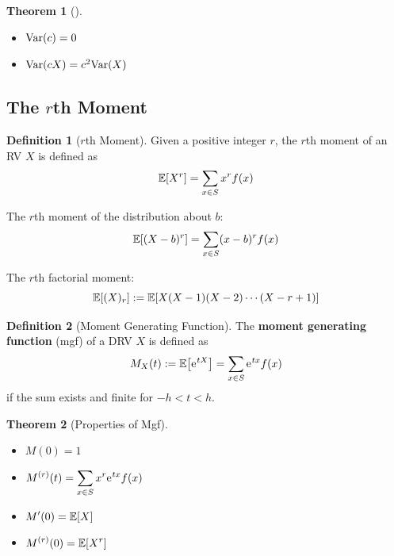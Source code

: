 \documentclass[10pt,UTF8]{article}
\newenvironment{definition box}
{\begin{tcolorbox}[colback=blue!5!white,colframe=blue!75!black,parbox=false,before upper=\par,before lower=\par]}
{\end{tcolorbox}}
\newenvironment{theorem box}
{\begin{tcolorbox}[colback=yellow!5!white,colframe=yellow!75!black,parbox=false,before upper=\par,before lower=\par]}
{\end{tcolorbox}}
\theoremstyle{definition}
\newtheorem{definition inner}{Definition}[section]
\newenvironment{definition}[1][]
{\begin{definition box}\begin{definition inner}[#1]\hfill\par}
{\end{definition inner}\end{definition box}}
\theoremstyle{plain}
\newtheorem{theorem inner}{Theorem}[section]
\newenvironment{theorem}[1][]
{\begin{theorem box}\begin{theorem inner}[#1]\hfill\par}
{\end{theorem inner}\end{theorem box}}
\theoremstyle{definition}
\newtheorem*{proof inner}{\textit{Proof}}
\theoremstyle{remark}
\newcommand{\e}{\mathrm{e}{\mkern 1 mu}}
\newcommand{\E}[1]{\mathbb{E}\qty[#1]}  %
\newcommand{\Var}[1]{\mathrm{Var}\qty(#1)}  %
\begin{document}
\begin{theorem}
    \begin{itemize}
        \item $\Var{c} = 0$
        \item $\Var{c X} = c^2 \Var{X}$
    \end{itemize}
\end{theorem}

\subsection{The \texorpdfstring{$r$}{r}th Moment}

\begin{definition}[$r$th Moment]
    Given a positive integer $r$, the $r$th moment of an RV $X$ is defined as
    \begin{equation*}
        \E{X^r} = \sum_{x\in S}x^r f(x)
    \end{equation*}

    The $r$th moment of the distribution about $b$:
    \begin{equation*}
        \E{(X-b)^r} = \sum_{x\in S}(x-b)^r f(x)
    \end{equation*}

    The $r$th factorial moment:
    \begin{equation*}
        \E{(X)_r} :=  \E{X(X-1)(X-2)\cdots(X-r+1)}
    \end{equation*}
\end{definition}

\begin{definition}[Moment Generating Function]
    The \textbf{moment generating function} (mgf) of a DRV $X$ is defined as
    \begin{equation*}
        M_X(t) := \E{\e^{t X}} = \sum_{x\in S}\e^{t x} f(x)
    \end{equation*}
    if the sum exists and finite for $-h < t < h$.
\end{definition}

\begin{theorem}[Properties of Mgf]
    \begin{itemize}
        \item $M(0) = 1$
        \item $\displaystyle M^{(r)}(t) = \sum_{x\in S}x^r \e^{tx} f(x)$
        \item $\displaystyle M'(0) = \E{X}$
        \item $\displaystyle M^{(r)}(0) = \E{X^r}$
    \end{itemize}
\end{theorem}
\end{document}
